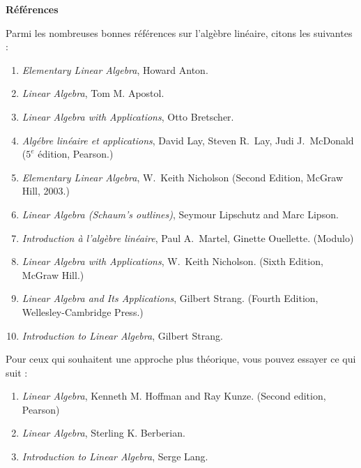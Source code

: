 
\centerline{\bf R\'ef\'erences}
  \bigskip
Parmi les nombreuses bonnes références sur l'algèbre linéaire, citons les suivantes :

\begin{enumerate}[]
\item {\it Elementary Linear Algebra}, Howard Anton.
 \smallskip

\item {\it  Linear Algebra}, Tom M. Apostol.
 \smallskip
 \item {\it Linear Algebra with Applications}, Otto Bretscher. 
\smallskip
\item {\it Alg\'ebre lin\'eaire et applications}, David Lay, Steven R.~Lay, Judi J.~McDonald ($5^e$ édition, Pearson.)
 \smallskip
 \item {\it Elementary Linear Algebra}, W.~Keith Nicholson (Second Edition, McGraw Hill, 2003.)
\smallskip
\item {\it Linear Algebra (Schaum's outlines)}, Seymour Lipschutz and Marc Lipson.
\smallskip
\item {\it Introduction à l'algèbre linéaire}, Paul A.~Martel, Ginette Ouellette. (Modulo)
\smallskip 
\item {\it Linear Algebra with Applications}, W.~Keith Nicholson. (Sixth Edition, McGraw Hill.)
\smallskip
 \item {\it Linear Algebra and Its Applications}, Gilbert Strang. (Fourth Edition, Wellesley-Cambridge Press.)
\smallskip
\item {\it Introduction to Linear Algebra}, Gilbert Strang.


\end{enumerate}

\vspace{1cm}
Pour ceux qui souhaitent une approche plus théorique, vous pouvez essayer ce qui suit :

\begin{enumerate}[]
\item {\it Linear Algebra}, Kenneth M. Hoffman and Ray Kunze. (Second edition, Pearson)
 \smallskip
 \item {\it Linear Algebra}, Sterling K. Berberian. 
\smallskip
 \item {\it Introduction to Linear Algebra}, Serge Lang.


\end{enumerate}
